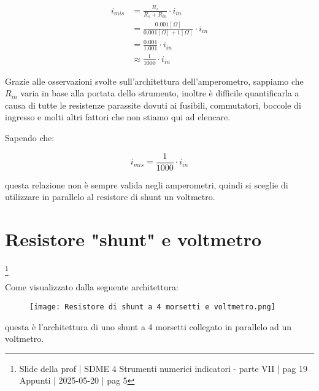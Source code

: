 {
    \Large 
    \begin{equation}
        \begin{split}
            i_{mis}
            &= 
            \frac{R_s}{R_s + R_{in}} \cdot i_{in}
            \\
            &= 
            \frac{0.001 [\Omega]}{0.001 [\Omega] + 1 [\Omega]} \cdot i_{in}
            \\
            &=
            \frac{0.001}{1.001} \cdot i_{in}
            \\
            &\approx
            \frac{1}{1000} \cdot i_{in}
        \end{split}
    \end{equation}
}

Grazie alle osservazioni svolte sull'architettura dell'amperometro, 
sappiamo che $R_{in}$ varia in base alla portata dello strumento, 
inoltre è difficile quantificarla a causa di tutte le resistenze parassite dovuti ai fusibili, commutatori, boccole di ingresso e molti altri fattori che non stiamo qui ad elencare. \newline 

Sapendo che: 

{
    \Large 
    \begin{equation}
        i_{mis}
        =
        \frac{1}{1000} \cdot i_{in}
    \end{equation}
}

questa relazione non è sempre valida negli amperometri, 
quindi si sceglie di utilizzare in parallelo al resistore di shunt un voltmetro. \newline 

\newpage 

\section{Resistore "shunt" e voltmetro}
\footnote{Slide della prof | SDME 4 Strumenti numerici indicatori - parte VII | pag 19\\  
Appunti | 2025-05-20 | pag 5 }

Come visualizzato dalla seguente architettura: 

\begin{figure}[h]
    \centering
    \texttt{[image: Resistore di shunt a 4 morsetti e voltmetro.png]}
\end{figure}

questa è l'architettura di uno shunt a 4 morsetti collegato in parallelo ad un voltmetro. \newline 

